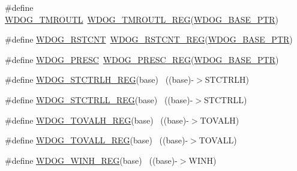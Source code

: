 \begin{DoxyCompactItemize}
\item 
\#define \hyperlink{group___w_d_o_g___register___accessor___macros_ga37ac1b7e81db9a5b20a502c970d712c2}{W\+D\+O\+G\+\_\+\+T\+M\+R\+O\+U\+TL}~\hyperlink{group___w_d_o_g___register___accessor___macros_gaed1d5071ac9fb7f531fdda660780a329}{W\+D\+O\+G\+\_\+\+T\+M\+R\+O\+U\+T\+L\+\_\+\+R\+EG}(\hyperlink{group___w_d_o_g___peripheral_ga72fb27c7bc1ae124f180d8f2c7b9fa79}{W\+D\+O\+G\+\_\+\+B\+A\+S\+E\+\_\+\+P\+TR})
\item 
\#define \hyperlink{group___w_d_o_g___register___accessor___macros_gae3600ebbeca42091142fe17f7f2eab6a}{W\+D\+O\+G\+\_\+\+R\+S\+T\+C\+NT}~\hyperlink{group___w_d_o_g___register___accessor___macros_ga321d566d296ee323809e242077a1c776}{W\+D\+O\+G\+\_\+\+R\+S\+T\+C\+N\+T\+\_\+\+R\+EG}(\hyperlink{group___w_d_o_g___peripheral_ga72fb27c7bc1ae124f180d8f2c7b9fa79}{W\+D\+O\+G\+\_\+\+B\+A\+S\+E\+\_\+\+P\+TR})
\item 
\#define \hyperlink{group___w_d_o_g___register___accessor___macros_gac927e6dd73774cbbb57d36bbe3351925}{W\+D\+O\+G\+\_\+\+P\+R\+E\+SC}~\hyperlink{group___w_d_o_g___register___accessor___macros_gacbfa99926928928f05da2e4c752ea945}{W\+D\+O\+G\+\_\+\+P\+R\+E\+S\+C\+\_\+\+R\+EG}(\hyperlink{group___w_d_o_g___peripheral_ga72fb27c7bc1ae124f180d8f2c7b9fa79}{W\+D\+O\+G\+\_\+\+B\+A\+S\+E\+\_\+\+P\+TR})
\item 
\#define \hyperlink{group___w_d_o_g___register___accessor___macros_gafe3961a26965f4d22fa82eb4a6906efa}{W\+D\+O\+G\+\_\+\+S\+T\+C\+T\+R\+L\+H\+\_\+\+R\+EG}(base)                                  ~((base)-\/$>$S\+T\+C\+T\+R\+LH)
\item 
\#define \hyperlink{group___w_d_o_g___register___accessor___macros_gab5f636177e7295761f4d366fc6f2d9c5}{W\+D\+O\+G\+\_\+\+S\+T\+C\+T\+R\+L\+L\+\_\+\+R\+EG}(base)                                  ~((base)-\/$>$S\+T\+C\+T\+R\+LL)
\item 
\#define \hyperlink{group___w_d_o_g___register___accessor___macros_gaa18bf2a6abf1641d711ee0a8e963d704}{W\+D\+O\+G\+\_\+\+T\+O\+V\+A\+L\+H\+\_\+\+R\+EG}(base)                                    ~((base)-\/$>$T\+O\+V\+A\+LH)
\item 
\#define \hyperlink{group___w_d_o_g___register___accessor___macros_gaf4ebf9d6344af3fa4c4cf0219a334dac}{W\+D\+O\+G\+\_\+\+T\+O\+V\+A\+L\+L\+\_\+\+R\+EG}(base)                                    ~((base)-\/$>$T\+O\+V\+A\+LL)
\item 
\#define \hyperlink{group___w_d_o_g___register___accessor___macros_gacb494604d8f57ea1aa0a6d8c9921b955}{W\+D\+O\+G\+\_\+\+W\+I\+N\+H\+\_\+\+R\+EG}(base)                                        ~((base)-\/$>$W\+I\+NH)

\end{DoxyCompactItemize}
